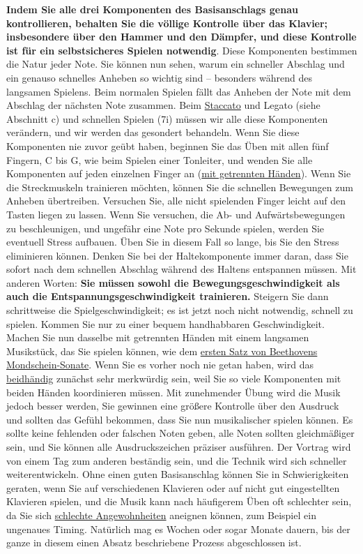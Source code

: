 \textbf{Indem Sie alle drei Komponenten des Basisanschlags genau kontrollieren, behalten Sie die völlige Kontrolle über das Klavier; insbesondere über den Hammer und den Dämpfer, und diese Kontrolle ist für ein selbstsicheres Spielen notwendig}.
Diese Komponenten bestimmen die Natur jeder Note.
Sie können nun sehen, warum ein schneller Abschlag und ein genauso schnelles Anheben so wichtig sind -- besonders während des langsamen Spielens.
Beim normalen Spielen fällt das Anheben der Note mit dem Abschlag der nächsten Note zusammen.
Beim \hyperref[c1iii1c]{Staccato} und Legato (siehe Abschnitt c) und schnellen Spielen (7i) müssen wir alle diese Komponenten verändern, und wir werden das gesondert behandeln.
Wenn Sie diese Komponenten nie zuvor geübt haben, beginnen Sie das Üben mit allen fünf Fingern, C bis G, wie beim Spielen einer Tonleiter, und wenden Sie alle Komponenten auf jeden einzelnen Finger an (\hyperref[c1ii7]{mit getrennten Händen}).
Wenn Sie die Streckmuskeln trainieren möchten, können Sie die schnellen Bewegungen zum Anheben übertreiben.
Versuchen Sie, alle nicht spielenden Finger leicht auf den Tasten liegen zu lassen.
Wenn Sie versuchen, die Ab- und Aufwärtsbewegungen zu beschleunigen, und ungefähr eine Note pro Sekunde spielen, werden Sie eventuell Stress aufbauen.
Üben Sie in diesem Fall so lange, bis Sie den Stress eliminieren können.
Denken Sie bei der Haltekomponente immer daran, dass Sie sofort nach dem schnellen Abschlag während des Haltens entspannen müssen.
Mit anderen Worten: \textbf{Sie müssen sowohl die Bewegungsgeschwindigkeit als auch die Entspannungsgeschwindigkeit trainieren.}
Steigern Sie dann schrittweise die Spielgeschwindigkeit; es ist jetzt noch nicht notwendig, schnell zu spielen.
Kommen Sie nur zu einer bequem handhabbaren Geschwindigkeit.
Machen Sie nun dasselbe mit getrennten Händen mit einem langsamen Musikstück, das Sie spielen können, wie dem \hyperref[c1ii25b]{ersten Satz von Beethovens Mondschein-Sonate}.
Wenn Sie es vorher noch nie getan haben, wird das \hyperref[c1ii25]{beidhändig} zunächst sehr merkwürdig sein, weil Sie so viele Komponenten mit beiden Händen koordinieren müssen.
Mit zunehmender Übung wird die Musik jedoch besser werden, Sie gewinnen eine größere Kontrolle über den Ausdruck und sollten das Gefühl bekommen, dass Sie nun musikalischer spielen können.
Es sollte keine fehlenden oder falschen Noten geben, alle Noten sollten gleichmäßiger sein, und Sie können alle Ausdruckszeichen präziser ausführen.
Der Vortrag wird von einem Tag zum anderen beständig sein, und die Technik wird sich schneller weiterentwickeln.
Ohne einen guten Basisanschlag können Sie in Schwierigkeiten geraten, wenn Sie auf verschiedenen Klavieren oder auf nicht gut eingestellten Klavieren spielen, und die Musik kann nach häufigerem Üben oft schlechter sein, da Sie sich \hyperref[c1ii22]{schlechte Angewohnheiten} aneignen können, zum Beispiel ein ungenaues Timing.
Natürlich mag es Wochen oder sogar Monate dauern, bis der ganze in diesem einen Absatz beschriebene Prozess abgeschlossen ist.


